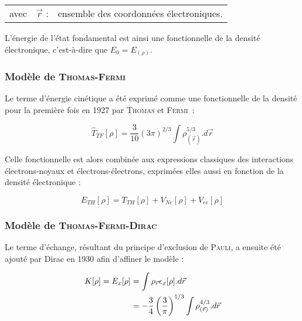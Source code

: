 	\begin{flushleft}
		\begin{tabular}{@{}lrp{10cm}}
			avec & $\vec{r}$ : & ensemble des coordonnées électroniques. 
		\end{tabular}
	\end{flushleft}
	
	
	L'énergie de l'état fondamental est ainsi une fonctionnelle de la densité électronique, c'est-à-dire que $E_{0} = E_{(\rho)}$.
	
	\subsubsection{Modèle de \textsc{Thomas-Fermi}}
	
	Le terme d'énergie cinétique a été exprimé comme une fonctionnelle de la densité pour la première fois en 1927 par \textsc{Thomas} et \textsc{Fermi}~:
	
	\begin{equation}
	\hat{T}_{TF}[\rho] = \frac{3}{10} (3\pi)^{2/3} \int \rho_{(\vec{r})}^{5/3} .d\vec{r}
	\label{ener_cin_thom_ferm}
	\end{equation}
	
	Celle fonctionnelle est alors combinée aux expressions classiques des interactions électrons-noyaux et électrons-électrons, exprimées elles aussi en fonction de la densité électronique :
	
	\begin{equation}
	E_{TH}[\rho] = T_{TH}[\rho] + V_{Ne}[\rho] + V_{ee}[\rho]
	\end{equation}
	
	\subsubsection{Modèle de \textsc{Thomas-Fermi-Dirac}}
	
	Le terme d'échange, résultant du principe d'exclusion de \textsc{Pauli}, a ensuite été ajouté par Dirac en 1930 afin d'affiner le modèle :
	
	\begin{align}
	K[\rho] = E_{x}[\rho] &= \int \rho_{\vec{r}} \epsilon_{x}[\rho] .d\vec{r} \\
	&= -\frac{3}{4} \left(\frac{3}{\pi}\right)^{1/3} \int \rho_{(\vec{r})}^{4/3} .d\vec{r} \notag
	\end{align}
	
